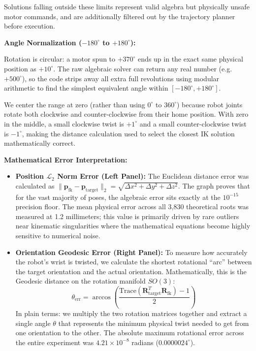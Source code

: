 \documentclass[11pt, a4paper]{article}
\begin{document}
Solutions falling outside these limits represent valid algebra but physically unsafe motor commands, and are additionally filtered out by the trajectory planner before execution.

\vspace{0.3cm}
\textbf{Angle Normalization ($-180^\circ$ to $+180^\circ$):}

Rotation is circular: a motor spun to $+370^\circ$ ends up in the exact same physical position as $+10^\circ$. The raw algebraic solver can return any real number (e.g.\ $+500^\circ$), so the code strips away all extra full revolutions using modular arithmetic to find the simplest equivalent angle within $[-180^\circ, +180^\circ]$.

We center the range at zero (rather than using $0^\circ$ to $360^\circ$) because robot joints rotate both clockwise and counter-clockwise from their home position. With zero in the middle, a small clockwise twist is $+1^\circ$ and a small counter-clockwise twist is $-1^\circ$, making the distance calculation used to select the closest IK solution mathematically correct.

\vspace{0.3cm}
\textbf{Mathematical Error Interpretation:}
\begin{itemize}
    \item \textbf{Position $\mathcal{L}_2$ Norm Error (Left Panel):} The Euclidean distance error was calculated as $\|\mathbf{p}_{\text{fk}} - \mathbf{p}_{\text{target}}\|_2 = \sqrt{\Delta x^2 + \Delta y^2 + \Delta z^2}$. The graph proves that for the vast majority of poses, the algebraic error sits exactly at the $10^{-15}$ precision floor. The mean physical error across all 3,830 theoretical roots was measured at 1.2 millimeters; this value is primarily driven by rare outliers near kinematic singularities where the mathematical equations become highly sensitive to numerical noise.
    \item \textbf{Orientation Geodesic Error (Right Panel):} To measure how accurately the robot's wrist is twisted, we calculate the shortest rotational ``arc'' between the target orientation and the actual orientation. Mathematically, this is the Geodesic distance on the rotation manifold $SO(3)$:
    \begin{equation*}
        \theta_{\text{err}} = \arccos \left( \frac{\text{Trace}(\mathbf{R}_{\text{target}}^T \mathbf{R}_{\text{fk}}) - 1}{2} \right)
    \end{equation*}
    In plain terms: we multiply the two rotation matrices together and extract a single angle $\theta$ that represents the minimum physical twist needed to get from one orientation to the other. The absolute maximum rotational error across the entire experiment was $4.21 \times 10^{-8}$ radians ($0.0000024^\circ$).
\end{itemize}
\end{document}
